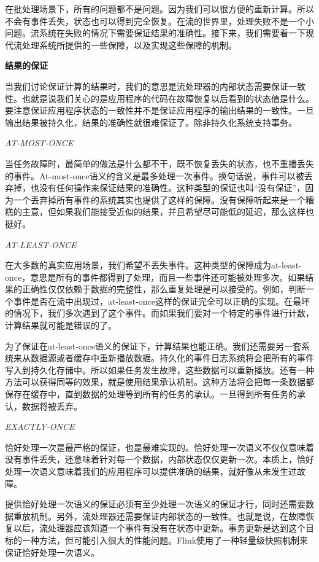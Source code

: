 \documentclass[cn,11pt,chinese]{elegantbook}
\begin{document}
在批处理场景下，所有的问题都不是问题。因为我们可以很方便的重新计算。所以不会有事件丢失，状态也可以得到完全恢复。在流的世界里，处理失败不是一个小问题。流系统在失败的情况下需要保证结果的准确性。接下来，我们需要看一下现代流处理系统所提供的一些保障，以及实现这些保障的机制。

\textbf{结果的保证}

当我们讨论保证计算的结果时，我们的意思是流处理器的内部状态需要保证一致性。也就是说我们关心的是应用程序的代码在故障恢复以后看到的状态值是什么。要注意保证应用程序状态的一致性并不是保证应用程序的输出结果的一致性。一旦输出结果被持久化，结果的准确性就很难保证了。除非持久化系统支持事务。

\textit{AT-MOST-ONCE}

当任务故障时，最简单的做法是什么都不干，既不恢复丢失的状态，也不重播丢失的事件。At-most-once语义的含义是最多处理一次事件。换句话说，事件可以被丢弃掉，也没有任何操作来保证结果的准确性。这种类型的保证也叫“没有保证”，因为一个丢弃掉所有事件的系统其实也提供了这样的保障。没有保障听起来是一个糟糕的主意，但如果我们能接受近似的结果，并且希望尽可能低的延迟，那么这样也挺好。

\textit{AT-LEAST-ONCE}

在大多数的真实应用场景，我们希望不丢失事件。这种类型的保障成为at-least-once，意思是所有的事件都得到了处理，而且一些事件还可能被处理多次。如果结果的正确性仅仅依赖于数据的完整性，那么重复处理是可以接受的。例如，判断一个事件是否在流中出现过，at-least-once这样的保证完全可以正确的实现。在最坏的情况下，我们多次遇到了这个事件。而如果我们要对一个特定的事件进行计数，计算结果就可能是错误的了。

为了保证在at-least-once语义的保证下，计算结果也能正确。我们还需要另一套系统来从数据源或者缓存中重新播放数据。持久化的事件日志系统将会把所有的事件写入到持久化存储中。所以如果任务发生故障，这些数据可以重新播放。还有一种方法可以获得同等的效果，就是使用结果承认机制。这种方法将会把每一条数据都保存在缓存中，直到数据的处理等到所有的任务的承认。一旦得到所有任务的承认，数据将被丢弃。

\textit{EXACTLY-ONCE}

恰好处理一次是最严格的保证，也是最难实现的。恰好处理一次语义不仅仅意味着没有事件丢失，还意味着针对每一个数据，内部状态仅仅更新一次。本质上，恰好处理一次语义意味着我们的应用程序可以提供准确的结果，就好像从未发生过故障。

提供恰好处理一次语义的保证必须有至少处理一次语义的保证才行，同时还需要数据重放机制。另外，流处理器还需要保证内部状态的一致性。也就是说，在故障恢复以后，流处理器应该知道一个事件有没有在状态中更新。事务更新是达到这个目标的一种方法，但可能引入很大的性能问题。Flink使用了一种轻量级快照机制来保证恰好处理一次语义。
\end{document}
